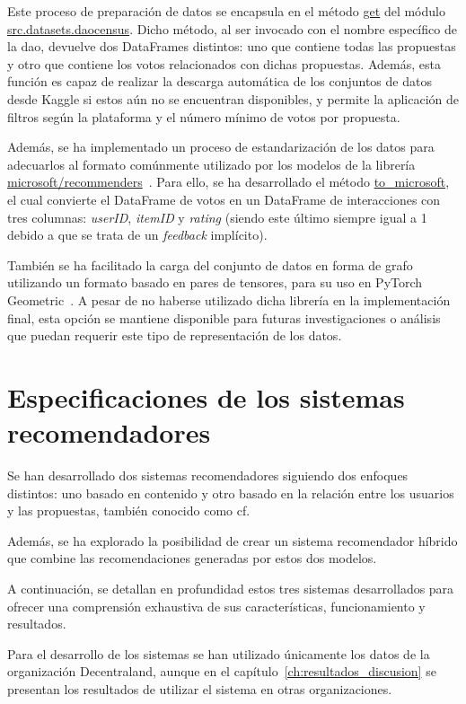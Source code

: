 Este proceso de preparación de datos se encapsula en el método \url{get} del módulo \url{src.datasets.daocensus}. Dicho método, al ser invocado con el nombre específico de la \gls{dao}, devuelve dos DataFrames distintos: uno que contiene todas las propuestas y otro que contiene los votos relacionados con dichas propuestas. Además, esta función es capaz de realizar la descarga automática de los conjuntos de datos desde Kaggle si estos aún no se encuentran disponibles, y permite la aplicación de filtros según la plataforma y el número mínimo de votos por propuesta.

Además, se ha implementado un proceso de estandarización de los datos para adecuarlos al formato comúnmente utilizado por los modelos de la librería \url{microsoft/recommenders}~\cite{argyriou_microsoft_2020}. Para ello, se ha desarrollado el método \url{to_microsoft}, el cual convierte el DataFrame de votos en un DataFrame de interacciones con tres columnas: \textit{userID}, \textit{itemID} y \textit{rating} (siendo este último siempre igual a 1 debido a que se trata de un \textit{feedback} implícito).

También se ha facilitado la carga del conjunto de datos en forma de grafo utilizando un formato basado en pares de tensores, para su uso en PyTorch Geometric~\cite{fey_fast_2019}. A pesar de no haberse utilizado dicha librería en la implementación final, esta opción se mantiene disponible para futuras investigaciones o análisis que puedan requerir este tipo de representación de los datos.

\section{Especificaciones de los sistemas recomendadores}

Se han desarrollado dos sistemas recomendadores siguiendo dos enfoques distintos: uno basado en contenido y otro basado en la relación entre los usuarios y las propuestas, también conocido como \acrfull{cf}.

Además, se ha explorado la posibilidad de crear un sistema recomendador híbrido que combine las recomendaciones generadas por estos dos modelos.

A continuación, se detallan en profundidad estos tres sistemas desarrollados para ofrecer una comprensión exhaustiva de sus características, funcionamiento y resultados.

Para el desarrollo de los sistemas se han utilizado únicamente los datos de la organización Decentraland, aunque en el capítulo~\ref{ch:resultados_discusion} se presentan los resultados de utilizar el sistema en otras organizaciones.

